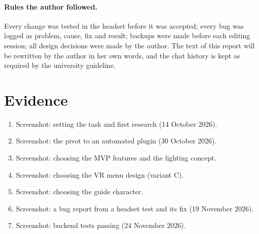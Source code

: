 \paragraph{Rules the author followed.} Every change was tested in the headset before it was accepted; every bug was logged as problem, cause, fix and result; backups were made before each editing session; all design decisions were made by the author. The text of this report will be rewritten by the author in her own words, and the chat history is kept as required by the university guideline.

\section*{Evidence}

\begin{enumerate}
\item Screenshot: setting the task and first research (14 October 2026).
\item Screenshot: the pivot to an automated plugin (30 October 2026).
\item Screenshot: choosing the MVP features and the lighting concept.
\item Screenshot: choosing the VR menu design (variant C).
\item Screenshot: choosing the guide character.
\item Screenshot: a bug report from a headset test and its fix (19 November 2026).
\item Screenshot: backend tests passing (24 November 2026).
\end{enumerate}
